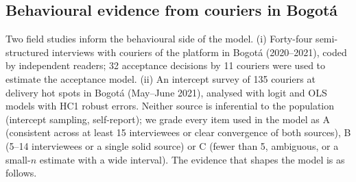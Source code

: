 \documentclass[preprint,12pt,authoryear]{elsarticle}%
\begin{document}
\subsection{Behavioural evidence from couriers in Bogot\'a}

Two field studies inform the behavioural side of the model. (i) Forty-four semi-structured interviews with couriers of the platform in Bogot\'a (2020--2021), coded by independent readers; 32 acceptance decisions by 11 couriers were used to estimate the acceptance model. (ii) An intercept survey of 135 couriers at delivery hot spots in Bogot\'a (May--June 2021), analysed with logit and OLS models with HC1 robust errors. Neither source is inferential to the population (intercept sampling, self-report); we grade every item used in the model as A (consistent across at least 15 interviewees or clear convergence of both sources), B (5--14 interviewees or a single solid source) or C (fewer than 5, ambiguous, or a small-$n$ estimate with a wide interval). The evidence that shapes the model is as follows.
\end{document}
